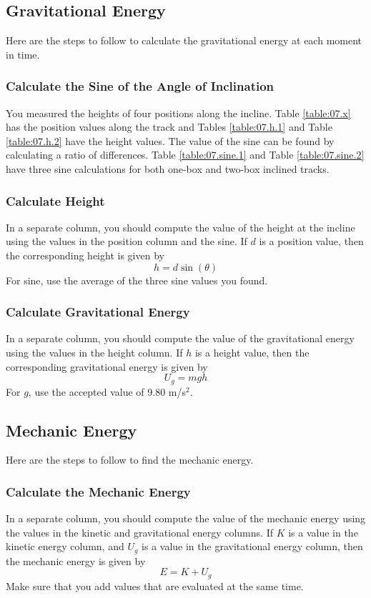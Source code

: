 \subsection{Gravitational Energy}
%
Here are the steps to follow to calculate the gravitational energy at each moment in time.
%
\subsubsection{Calculate the Sine of the Angle of Inclination}
%
You measured the heights of four positions along the incline. Table \ref{table:07.x} has the position values along the track and Tables \ref{table:07.h.1} and Table \ref{table:07.h.2} have the height values. The value of the sine can be found by calculating a ratio of differences. Table \ref{table:07.sine.1} and Table \ref{table:07.sine.2} have three sine calculations for both one-box and two-box inclined tracks.
%
\subsubsection{Calculate Height}
%
In a separate column, you should compute the value of the height at the incline using the values in the position column and the sine. If $d$ is a position value, then the corresponding height is given by
\begin{equation}
    h = d \sin(\theta)
\end{equation}
For sine, use the average of the three sine values you found.
%
\subsubsection{Calculate Gravitational Energy}
%
In a separate column, you should compute the value of the gravitational energy using the values in the height column. If $h$ is a height value, then the corresponding gravitational energy is given by
\begin{equation}
    U_{g} = m g h
\end{equation}
For $g$, use the accepted value of 9.80 m/s$^{2}$.
%
\subsection{Mechanic Energy}
%
Here are the steps to follow to find the mechanic energy.
%
\subsubsection{Calculate the Mechanic Energy}
%
In a separate column, you should compute the value of the mechanic energy using the values in the kinetic and gravitational energy columns. If $K$ is a value in the kinetic energy column, and $U_{g}$ is a value in the gravitational energy column, then the mechanic energy is given by
\begin{equation}
    E = K + U_{g}
\end{equation}
Make sure that you add values that are evaluated at the same time.
%
